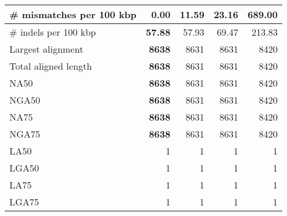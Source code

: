 \documentclass[12pt,a4paper]{article}
\begin{document}
\begin{table}[ht]
\begin{center}
\begin{tabular}{|l*{4}{|r}|}
\# mismatches per 100 kbp & {\bf 0.00} & 11.59 & 23.16 & 689.00 \\ \hline
\# indels per 100 kbp & {\bf 57.88} & 57.93 & 69.47 & 213.83 \\ \hline
Largest alignment & {\bf 8638} & 8631 & 8631 & 8420 \\ \hline
Total aligned length & {\bf 8638} & 8631 & 8631 & 8420 \\ \hline
NA50 & {\bf 8638} & 8631 & 8631 & 8420 \\ \hline
NGA50 & {\bf 8638} & 8631 & 8631 & 8420 \\ \hline
NA75 & {\bf 8638} & 8631 & 8631 & 8420 \\ \hline
NGA75 & {\bf 8638} & 8631 & 8631 & 8420 \\ \hline
LA50 & 1 & 1 & 1 & 1 \\ \hline
LGA50 & 1 & 1 & 1 & 1 \\ \hline
LA75 & 1 & 1 & 1 & 1 \\ \hline
LGA75 & 1 & 1 & 1 & 1 \\ \hline
\end{tabular}
\end{center}
\end{table}
\end{document}
